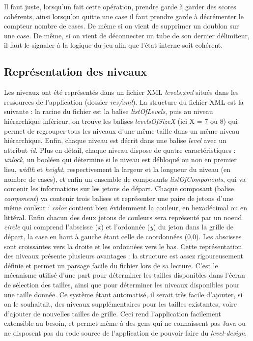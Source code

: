 \documentclass[12pt, a4paper]{article}%
\begin{document}
    Il faut juste, lorsqu'un fait cette opération, prendre garde à garder des scores cohérents, ainsi lorsqu'on quitte une case
    il faut prendre garde à décrémenter le compteur nombre de cases. De même si on vient de supprimer un doublon sur une case.
    De même, si on vient de déconnecter un tube de son dernier délimiteur, il faut le signaler à la logique du jeu afin que l'état
    interne soit cohérent.
    \subsection{Représentation des niveaux}
    Les niveaux ont été représentés dans un fichier XML \textit{levels.xml} situés dans les ressources de l'application (dossier \textit{res/xml}). La structure du fichier XML est la suivante : la racine du fichier est la balise \textit{listOfLevels}, puis au niveau hiérarchique inférieur, on trouve les balises \textit{levelsOfSizeX} (ici X = 7 ou 8) qui permet de regrouper tous les niveaux d'une même taille dans un même niveau hiérarchique. Enfin, chaque niveau est décrit dans une balise \textit{level} avec un attribut \textit{id}.
    \newline
    Plus en détail, chaque niveau dispose de quatre caractéristiques : \textit{unlock}, un booléen qui détermine si le niveau est débloqué ou non en premier lieu, \textit{width} et \textit{height}, respectivement la largeur et la longueur du niveau (en nombre de cases), et enfin un ensemble de composants \textit{listOfComponents}, qui va contenir les informations sur les jetons de départ. Chaque composant (balise \textit{component}) va contenir trois balises et représenter une paire de jetons d'une même couleur : \textit{color} contient bien évidemment la couleur, en hexadécimal ou en littéral. Enfin chacun des deux jetons de couleurs sera représenté par un noeud \textit{circle} qui comprend l'abscisse (\textit{x}) et l'ordonnée (\textit{y}) du jeton dans la grille de départ, la case en haut à gauche étant celle de coordonnées (0,0). Les abscisses sont croissantes vers la droite et les ordonnées vers le bas.
    \newline
    Cette représentation des niveaux présente plusieurs avantages : la structure est assez rigoureusement définie et permet un parsage facile du fichier lors de sa lecture. C'est le mécanisme utilisé d'une part pour déterminer les tailles disponibles dans l'écran de sélection des tailles, ainsi que pour déterminer les niveaux disponibles pour une taille donnée. Ce système étant automatisé, il serait très facile d'ajouter, si on le souhaitait, des niveaux supplémentaires pour les tailles existantes, voire d'ajouter de nouvelles tailles de grille. Ceci rend l'application facilement extensible au besoin, et permet même à des gens qui ne connaissent pas Java ou ne disposent pas du code source de l'application de pouvoir faire du \textit{level-design}.
    
\end{document}
